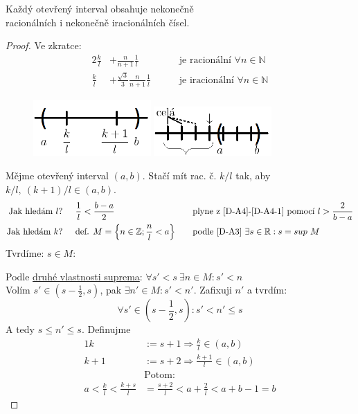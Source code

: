 \begin{theorem}
Každý otevřený interval obsahuje nekonečně \\ racionálních i nekonečně iracionálních čísel.
\end{theorem}
\begin{proof}
	Ve zkratce:
	\begin{alignat}{2}
		\frac{k}{l}&+\frac{n}{n+1}\frac{1}{l} &&\quad\text{ je racionální }\forall n\in\mathbb{N} \\
		\frac{k}{l}&+\frac{\sqrt{3}}{3}\frac{n}{n+1}\frac{1}{l} &&\quad\text{ je iracionální }\forall n\in\mathbb{N}
	\end{alignat}
	\begin{figure}[ht!]
		\begin{center}
			\includegraphics[width=0.4\textwidth,keepaspectratio]{../img/chapter1/interval.png}
			\includegraphics[width=0.4\textwidth,keepaspectratio]{../img/chapter1/interval2.png}
		\end{center}
	\end{figure}\FloatBarrier
	
	Mějme otevřený interval $(a,b)$. Stačí mít rac. č. $k/l$ tak, aby \\$k/l,~(k+1)/l\in(a,b)$.
	\begin{alignat*}{2}
		\text{Jak hledám $l$? }&\quad\frac{1}{l}<\frac{b-a}{2}
			&&\quad\text{plyne z \ref*{D-A4}-\ref{D-A4-1} pomocí }l>\frac{2}{b-a}\\
		\text{Jak hledám $k$? }&\quad\text{def. }M=\left\{n\in\mathbb{Z};\frac{n}{l}<a\right\}
			&&\quad\text{podle \ref{D-A3} }\exists s\in\mathbb{R}:s=sup~M
	\end{alignat*}
	Tvrdíme: $s\in M$:

	Podle \hyperref[D-supremum-2]{druhé vlastnosti suprema}: $\forall s'<s~\exists n\in M:s'<n$ \\
	Volím $s'\in\left(s-\frac{1}{2},s\right)$, pak $\exists n'\in M: s'<n'$. Zafixuji $n'$ a tvrdím:
	\begin{equation}\label{T-intervalSize-P-144}
		\forall s'\in (s-\frac{1}{2},s): s'<n'\leq s
	\end{equation}
	A tedy $s\leq n'\leq s$. Definujme
	\begin{alignat}{1}
		k&:=s+1 \Rightarrow \frac{k}{l}\in (a,b) \\
		k+1&:=s+2 \Rightarrow \frac{k+1}{l}\in (a,b) \\
		&\text{Potom:} \nonumber\\
		a<\frac{k}{l}<\frac{k+s}{l}&=\frac{s+2}{l}<a+\frac{2}{l}<a+b-1=b  %
	\end{alignat}
\end{proof}

